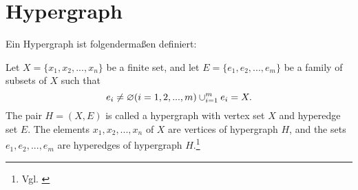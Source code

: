 \chapter*{Hypergraph}
Ein Hypergraph ist folgendermaßen definiert:
\begin{definition}
Let $X=\{x_{1}, x_{2},...,x_{n}\}$ be a finite set,
and let $E=\{e_{1},e_{2},...,e_{m}\}$ be a family of subsets of $X$ such that
    \[e_{i} \neq \varnothing (i=1,2,...,m) \\
    \cup_{i=1}^{m}e_{i}=X.
    \]
The pair $H=(X,E)$ is called a hypergraph with vertex set $X$
and hyperedge set $E$. The elements $x_{1}, x_{2},...,x_{n}$ of $X$ are vertices
    of hypergraph $H$, and the sets $e_{1}, e_{2},...,e_{m}$ are hyperedges of hypergraph $H$.\footnote{Vgl. \cite[Seite 2]{zhang2018hypergraph}}
\end{definition}


%